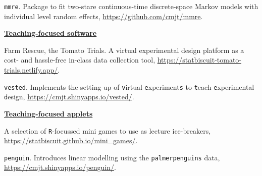 \documentclass[10pt,a4paper]{moderncv}
\begin{document}
\texttt{mmre}. Package to fit two-stare continuous-time discrete-space Markov models with individual level random effects, \url{https://github.com/cmjt/mmre}.\\






\vspace{2pt}

\underline{\textbf{Teaching-focused software}}\\
\vspace{-3pt}

Farm Rescue, the Tomato Trials. A virtual experimental design platform as a cost- and hassle-free in-class data collection tool, \url{https://statbiscuit-tomato-trials.netlify.app/}.\\

\vspace{-3pt}

\texttt{vested}. Implements the setting up of \texttt{v}irtual \texttt{e}xperiment\texttt{s} to \texttt{t}each \texttt{e}xperimental \texttt{d}esign, \url{https://cmjt.shinyapps.io/vested/}.\\

\vspace{2pt}

\underline{\textbf{Teaching-focused applets}}\\
\vspace{-3pt}

A selection of \texttt{R}-focussed mini games to use as lecture ice-breakers, \url{https://statbiscuit.github.io/mini_games/}.\\

\vspace{-3pt}

\texttt{penguin}. Introduces linear modelling using the \texttt{palmerpenguins} data, \url{https://cmjt.shinyapps.io/penguin/}.\\

\vspace{-3pt}
\end{document}
